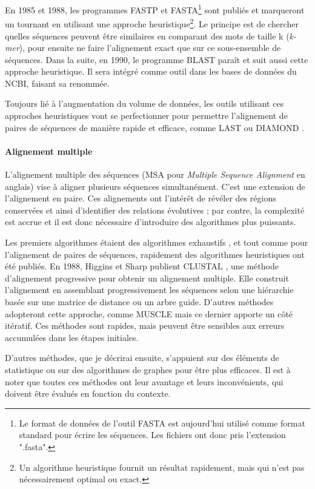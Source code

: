 En 1985 et 1988, les programmes FASTP et FASTA\footnote{Le format de données de l'outil FASTA est aujourd'hui utilisé comme format standard pour écrire les séquences. Les fichiers ont donc pris l'extension ".fasta".} \cite{lipman_rapid_1985,pearson_improved_1988}  sont publiés et marqueront un tournant en utilisant une approche heuristique\footnote{Un algorithme heuristique fournit un résultat rapidement, mais qui n'est pas nécessairement optimal ou exact.}. Le principe est de chercher quelles séquences peuvent être similaires en comparant des mots de taille k (\textit{k-mer}), pour ensuite ne faire l'alignement exact que sur ce sous-ensemble de séquences. Dans la suite, en 1990, le programme BLAST \cite{altschul_basic_1990} paraît et suit aussi cette approche heuristique. Il sera intégré comme outil dans les bases de données du NCBI, faisant sa renommée.  

Toujours lié à l'augmentation du volume de données, les outils utilisant ces approches heuristiques vont se perfectionner pour permettre l'alignement de paires de séquences de manière rapide et efficace, comme LAST \cite{kielbasa_adaptive_2011} ou DIAMOND \cite{buchfink_fast_2015}. 

\newpage
\paragraph{Alignement multiple}
\label{paragraph:MSA}

L'alignement multiple des séquences (MSA pour \textit{Multiple Sequence Alignment} en anglais) vise à aligner plusieurs séquences simultanément. C'est une extension de l'alignement en paire. Ces alignements ont l'intérêt de révéler des régions conservées et ainsi d'identifier des relations évolutives ; par contre, la complexité est accrue et il est donc nécessaire d'introduire des algorithmes plus puissants.

Les premiers algorithmes étaient des algorithmes exhaustifs \cite{stoye_multiple_1998}, et tout comme pour l'alignement de paires de séquences, rapidement des algorithmes heuristiques ont été publiés. En 1988, Higgins et Sharp publient CLUSTAL \cite{higgins_clustal_1988}, une méthode d'alignement progressive pour obtenir un alignement multiple. Elle construit l’alignement en assemblant progressivement les séquences selon une hiérarchie basée sur une matrice de distance ou un arbre guide. D'autres méthodes adopteront cette approche, comme MUSCLE \cite{edgar_muscle_2004} mais ce dernier apporte un côté itératif. Ces méthodes sont rapides, mais peuvent être sensibles aux erreurs accumulées dans les étapes initiales.

D'autres méthodes, que je décrirai ensuite, s'appuient sur des éléments de statistique ou sur des algorithmes de graphes pour être plus efficaces. Il est à noter que toutes ces méthodes ont leur avantage et leurs inconvénients, qui doivent être évalués en fonction du contexte.